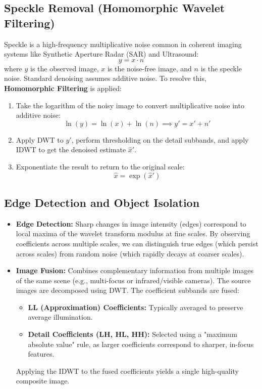 \documentclass[12pt,a4paper]{article}
\begin{document}
\subsection{Speckle Removal (Homomorphic Wavelet Filtering)}
Speckle is a high-frequency multiplicative noise common in coherent imaging systems like Synthetic Aperture Radar (SAR) and Ultrasound:
$$y = x \cdot n$$
where $y$ is the observed image, $x$ is the noise-free image, and $n$ is the speckle noise.
Standard denoising assumes additive noise. To resolve this, \textbf{Homomorphic Filtering} is applied:
\begin{enumerate}[leftmargin=*, itemsep=4pt]
  \item Take the logarithm of the noisy image to convert multiplicative noise into additive noise:
        $$\ln(y) = \ln(x) + \ln(n) \implies y' = x' + n'$$
  \item Apply DWT to $y'$, perform thresholding on the detail subbands, and apply IDWT to get the denoised estimate $\hat{x}'$.
  \item Exponentiate the result to return to the original scale:
        $$\hat{x} = \exp(\hat{x}')$$
\end{enumerate}

\subsection{Edge Detection and Object Isolation}
\begin{itemize}[leftmargin=*, itemsep=4.5pt]
  \item \textbf{Edge Detection:} Sharp changes in image intensity (edges) correspond to local maxima of the wavelet transform modulus at fine scales. By observing coefficients across multiple scales, we can distinguish true edges (which persist across scales) from random noise (which rapidly decays at coarser scales).
  \item \textbf{Image Fusion:} Combines complementary information from multiple images of the same scene (e.g., multi-focus or infrared/visible cameras). The source images are decomposed using DWT. The coefficient subbands are fused:
        \begin{itemize}[leftmargin=*, itemsep=2.5pt, topsep=2pt]
          \item \textbf{LL (Approximation) Coefficients:} Typically averaged to preserve average illumination.
          \item \textbf{Detail Coefficients (LH, HL, HH):} Selected using a "maximum absolute value" rule, as larger coefficients correspond to sharper, in-focus features.
        \end{itemize}
        Applying the IDWT to the fused coefficients yields a single high-quality composite image.
\end{itemize}
\end{document}
